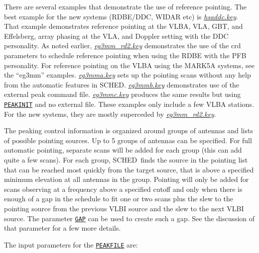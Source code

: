 \documentclass{report}
\newcommand{\sched}{{\sc SCHED}}
\newcommand{\schedb}{{\sc SCHED~}}
\begin{document}
There are several examples that demonstrate the use of reference
pointing.  The best example for the new systems (RDBE/DDC, WIDAR etc)
is 
{\href{examples/hsaddc.key}{{\sl hsaddc.key}}}.  That
example demonstrates reference pointing at the VLBA, VLA, GBT, and
Effelsberg, array phasing at the VLA, and Doppler setting with the DDC
personality.  As noted earlier, 
{\href{examples/eg3mm\_rd2.key}{{\sl eg3mm\_rd2.key}}}
demonstrates the use of the
crd parameters to schedule reference pointing when using the RDBE with
the PFB personality.  For reference pointing on the VLBA using the
MARK5A systems, see the ``eg3mm'' examples.  
{\href{examples/eg3mma.key}{{\sl eg3mma.key}}}
sets up the pointing scans without
any help from the automatic features in \sched.
{\href{examples/eg3mmb.key}{{\sl eg3mmb.key}}}
demonstrates use of the external peak command file.  
{\href{examples/eg3mmc.key}{{\sl eg3mmc.key}}}
produces the same results but using
{\hyperref[MP:PEAKINIT]{{\tt PEAKINIT}}} and no external file.  These
examples only include a few VLBA stations.  For the new systems, they
are mostly superceded by 
{\href{examples/eg3mm\_rd2.key}{{\sl eg3mm\_rd2.key}}}.

The peaking control information is organized around groups of antennas
and lists of possible pointing sources.  Up to 5 groups of antennas
can be specified.  For full automatic pointing, separate scans will be
added for each group (this can add quite a few scans).  For each
group, \schedb finds the source in the pointing list that can be
reached most quickly from the target source, that is above a specified
minimum elevation at all antennas in the group.  Pointing will only be
added for scans observing at a frequency above a specified cutoff and
only when there is enough of a gap in the schedule to fit one or two
scans plus the slew to the pointing source from the previous VLBI source
and the slew to the next VLBI source.  The parameter 
{\hyperref[MP:GAP]{{\tt GAP}}}
can be used to create such a gap.  See the discussion of
that parameter for a few more details.

The input parameters for the 
{\hyperref[MP:PEAKFILE]{{\tt PEAKFILE}}} are:
\end{document}
